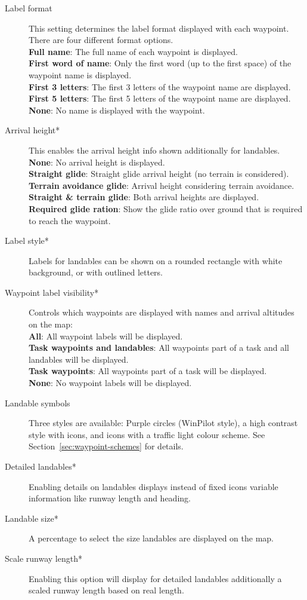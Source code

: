 \begin{description}
\item[Label format]  This setting \label{conf:labels} determines the label format 
  displayed with each waypoint. There are four different format options. \\
  {\bf Full name}: The full name of each waypoint is displayed. \\
  {\bf First word of name}: Only the first word (up to the first space) of the 
  waypoint name is displayed.
 \\
  {\bf First 3 letters}: The first 3 letters of the waypoint name are displayed. \\
  {\bf First 5 letters}: The first 5 letters of the waypoint name are displayed. \\
  {\bf None}: No name is displayed with the waypoint.
\item[Arrival height*] \label{conf:arrivalheight} This enables the arrival height info shown additionally 
  for landables. \\
  {\bf None}: No arrival height is displayed. \\
  {\bf Straight glide}: Straight glide arrival height (no terrain is considered). \\
  {\bf Terrain avoidance glide}: Arrival height considering terrain avoidance. \\
  {\bf Straight \& terrain glide}: Both arrival heights are
  displayed. \\
  {\bf Required glide ration}: Show the glide ratio over ground that is
  required to reach the waypoint.
\item[Label style*]  Labels for landables can be shown on a rounded rectangle with 
  white background, or with outlined letters.
\item[Waypoint label visibility*]  \label{conf:labelvisibility} Controls which waypoints 
  are displayed with names and arrival altitudes on the map: \\
  {\bf All}: All waypoint labels will be displayed. \\
  {\bf Task waypoints and landables}: All waypoints part of a task and all landables 
  will be displayed. \\
  {\bf Task waypoints}: All waypoints part of a task will be displayed. \\
  {\bf None}:  No waypoint labels will be displayed.
\item[Landable symbols]  \label{conf:waypointicons} Three styles are available:
  Purple circles (WinPilot style), a high contrast style with icons,
  and icons with a traffic light colour scheme. See Section~\ref{sec:waypoint-schemes} for details.
\item[Detailed landables*]  Enabling details on landables displays instead of fixed icons 
  variable information like runway length and heading.
\item[Landable size*]  A percentage to select the size landables are displayed on the map.
\item[Scale runway length*]  Enabling this option will display for detailed landables 
  additionally a scaled runway length based on real length.
\end{description}


